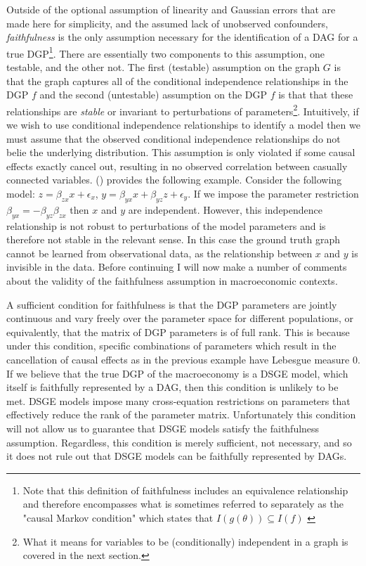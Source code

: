 \documentclass{article}
\begin{document}
Outside of the optional assumption of linearity and Gaussian errors that are made here for simplicity, and the assumed lack of unobserved confounders, \textit{faithfulness} is the only assumption necessary for the identification of a DAG for a true DGP\footnote{Note that this definition of faithfulness includes an equivalence relationship and therefore encompasses what is sometimes  referred to separately as the "causal Markov condition" which states that $I(g(\theta)) \subseteq I(f)$ \parencite{spirtes2016causal}}. There are essentially two components to this assumption, one testable, and the other not. The first (testable) assumption on the graph $G$ is that the graph captures all of the conditional independence relationships in the DGP $f$ and the second (untestable) assumption on the DGP $f$ is that that these relationships are \textit{stable} or invariant to perturbations of parameters\footnote{What it means for variables to be (conditionally) independent in a graph is covered in the next section.}. Intuitively, if we wish to use conditional independence relationships to identify a model then we must assume that the observed conditional independence relationships do not belie the underlying distribution. This assumption is only violated if some causal effects exactly cancel out, resulting in no observed correlation between casually connected variables. \citeauthor{pearl2009causality} (\citeyear{pearl2009causality}) provides the following example. Consider the following model: $z = \beta_{zx} x + \epsilon_x$, $ y = \beta_{yx} x + \beta_{yz} z + \epsilon_y$. If we impose the parameter restriction $\beta_{yx} = -\beta_{yz}\beta_{zx}$ then $x$ and $y$ are independent. However, this independence relationship is not robust to perturbations of the model parameters and is therefore not stable in the relevant sense. In this case the ground truth graph cannot be learned from observational data, as the relationship between $x$ and $y$ is invisible in the data. Before continuing I will now make a number of comments about the validity of the faithfulness assumption in macroeconomic contexts.

A sufficient condition for faithfulness is that the DGP parameters are jointly continuous and vary freely over the parameter space \parencite{steel2006homogeneity} for different populations, or equivalently, that the matrix of DGP parameters is of full rank. This is because under this condition, specific combinations of parameters which result in the cancellation of causal effects as in the previous example have Lebesgue measure 0. If we believe that the true DGP of the macroeconomy is a DSGE model, which itself is faithfully represented by a DAG, then this condition is unlikely to be met. DSGE models impose many cross-equation restrictions on parameters that effectively reduce the rank of the parameter matrix. Unfortunately this condition will not allow us to guarantee that DSGE models satisfy the faithfulness assumption. Regardless, this condition is merely sufficient, not necessary, and so it does not rule out that DSGE models can be faithfully represented by DAGs. 
\end{document}
